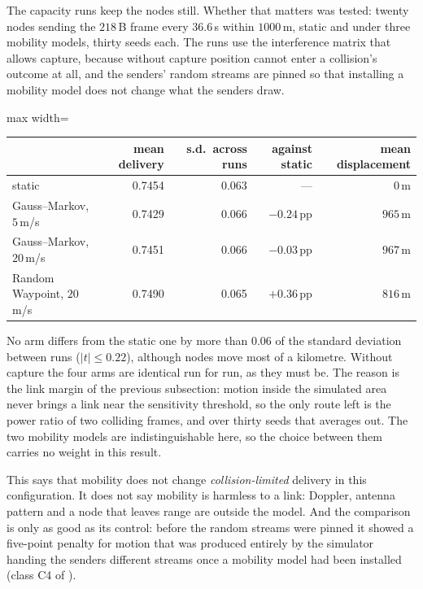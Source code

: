 The capacity runs keep the nodes still. Whether that matters was tested: twenty nodes sending
the $218$\,B frame every $36.6$\,s within $1000$\,m, static and under three mobility models,
thirty seeds each. The runs use the interference matrix that allows capture, because without
capture position cannot enter a collision's outcome at all, and the senders' random streams are
pinned so that installing a mobility model does not change what the senders draw.

\begin{center}
\begin{adjustbox}{max width=\textwidth}
\begin{tabular}{lrrrr}
\toprule
 & mean delivery & s.d.\ across runs & against static & mean displacement \\
\midrule
static                      & 0.7454 & 0.063 & ---        & $0$\,m \\
Gauss--Markov, $5$\,m/s      & 0.7429 & 0.066 & $-0.24$\,pp & $965$\,m \\
Gauss--Markov, $20$\,m/s     & 0.7451 & 0.066 & $-0.03$\,pp & $967$\,m \\
Random Waypoint, $20$\,m/s   & 0.7490 & 0.065 & $+0.36$\,pp & $816$\,m \\
\bottomrule
\end{tabular}
\end{adjustbox}
\end{center}

No arm differs from the static one by more than $0.06$ of the standard deviation between runs
($|t| \leq 0.22$), although nodes move most of a kilometre. Without capture the four arms are
identical run for run, as they must be. The reason is the link margin of the previous
subsection: motion inside the simulated area never brings a link near the sensitivity threshold,
so the only route left is the power ratio of two colliding frames, and over thirty seeds that
averages out. The two mobility models are indistinguishable here, so the choice between them
carries no weight in this result.

This says that mobility does not change \emph{collision-limited} delivery in this
configuration. It does not say mobility is harmless to a link: Doppler, antenna pattern and a
node that leaves range are outside the model. And the comparison is only as good as its
control: before the random streams were pinned it showed a five-point penalty for motion that
was produced entirely by the simulator handing the senders different streams once a mobility
model had been installed (class C4 of ).

